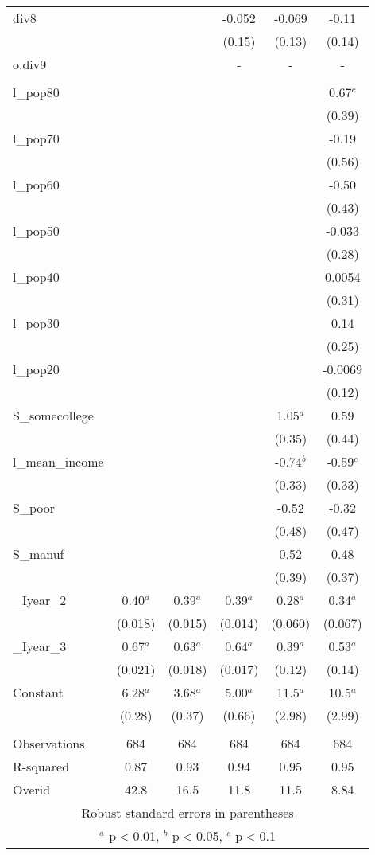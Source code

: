 \documentclass[]{article}
\begin{document}
\begin{tabular}{lccccc}
div8 &  &  & -0.052 & -0.069 & -0.11 \\
 &  &  & (0.15) & (0.13) & (0.14) \\
o.div9 &  &  & - & - & - \\
 &  &  &  &  &  \\
l\_pop80 &  &  &  &  & 0.67$^c$ \\
 &  &  &  &  & (0.39) \\
l\_pop70 &  &  &  &  & -0.19 \\
 &  &  &  &  & (0.56) \\
l\_pop60 &  &  &  &  & -0.50 \\
 &  &  &  &  & (0.43) \\
l\_pop50 &  &  &  &  & -0.033 \\
 &  &  &  &  & (0.28) \\
l\_pop40 &  &  &  &  & 0.0054 \\
 &  &  &  &  & (0.31) \\
l\_pop30 &  &  &  &  & 0.14 \\
 &  &  &  &  & (0.25) \\
l\_pop20 &  &  &  &  & -0.0069 \\
 &  &  &  &  & (0.12) \\
S\_somecollege &  &  &  & 1.05$^a$ & 0.59 \\
 &  &  &  & (0.35) & (0.44) \\
l\_mean\_income &  &  &  & -0.74$^b$ & -0.59$^c$ \\
 &  &  &  & (0.33) & (0.33) \\
S\_poor &  &  &  & -0.52 & -0.32 \\
 &  &  &  & (0.48) & (0.47) \\
S\_manuf &  &  &  & 0.52 & 0.48 \\
 &  &  &  & (0.39) & (0.37) \\
\_Iyear\_2 & 0.40$^a$ & 0.39$^a$ & 0.39$^a$ & 0.28$^a$ & 0.34$^a$ \\
 & (0.018) & (0.015) & (0.014) & (0.060) & (0.067) \\
\_Iyear\_3 & 0.67$^a$ & 0.63$^a$ & 0.64$^a$ & 0.39$^a$ & 0.53$^a$ \\
 & (0.021) & (0.018) & (0.017) & (0.12) & (0.14) \\
Constant & 6.28$^a$ & 3.68$^a$ & 5.00$^a$ & 11.5$^a$ & 10.5$^a$ \\
 & (0.28) & (0.37) & (0.66) & (2.98) & (2.99) \\
 &  &  &  &  &  \\
Observations & 684 & 684 & 684 & 684 & 684 \\
R-squared & 0.87 & 0.93 & 0.94 & 0.95 & 0.95 \\
 Overid & 42.8 & 16.5 & 11.8 & 11.5 & 8.84 \\ \hline
\multicolumn{6}{c}{ Robust standard errors in parentheses} \\
\multicolumn{6}{c}{ $^a$ p$<$0.01, $^b$ p$<$0.05, $^c$ p$<$0.1} \\
\end{tabular}
\end{document}
